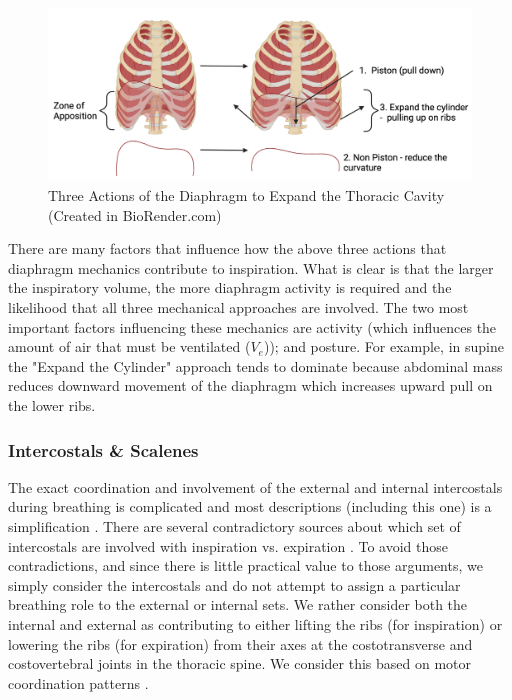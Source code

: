 \begin{figure}[]
    \centering
    \includegraphics[width = 1.0 \linewidth]{./figure/ventilation/diaphragm.png}
    \caption{Three Actions of the Diaphragm to Expand the Thoracic Cavity \footnotesize{(Created in BioRender.com)}}
    \label{fig:diaphragm}
\end{figure}

There are many factors that influence how the above three actions that diaphragm mechanics contribute to inspiration. What is clear is that the larger the inspiratory volume, the more diaphragm activity is required and the likelihood that all three mechanical approaches are involved. The two most important factors influencing these mechanics are activity (which influences the amount of air that must be ventilated ($V_e$)); and posture. For example, in supine the "Expand the Cylinder" approach tends to dominate because abdominal mass reduces downward movement of the diaphragm which increases upward pull on the lower ribs.

\subsubsection{Intercostals \& Scalenes}

The exact coordination and involvement of the external and internal intercostals during breathing is complicated and most descriptions (including this one) is a simplification \cite{lumb_nunns_2020, de_troyer_respiratory_2005}. There are several contradictory sources about which set of intercostals are involved with inspiration vs. expiration \cite{lumb_nunns_2020, hall_guyton_2020}. To avoid those contradictions, and since there is little practical value to those arguments, we simply consider the intercostals and do not attempt to assign a particular breathing role to the external or internal sets. We rather consider both the internal and external as contributing to either lifting the ribs (for inspiration) or lowering the ribs (for expiration) from their axes at the costotransverse and costovertebral joints in the thoracic spine. We consider this based on motor coordination patterns \cite{gilbert_recognizing_2014}.

